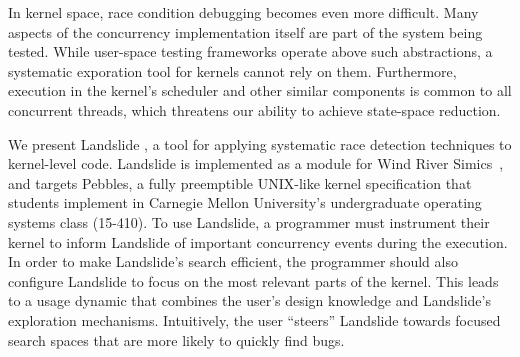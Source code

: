 \documentclass{llncs}
\begin{document}
In kernel space, race condition debugging becomes even more difficult. Many aspects of the concurrency implementation itself are part of the system being tested.
While user-space testing frameworks operate above such abstractions, a systematic exporation tool for kernels cannot rely on them.
Furthermore, execution in the kernel's scheduler and other similar components is common to all concurrent threads, which threatens our ability to achieve state-space reduction.



We present Landslide \cite{landslide},
a tool for applying systematic race detection techniques to kernel-level code.
Landslide is implemented as a module for Wind River Simics\textsuperscript{\texttrademark}~\cite{simics}, and targets Pebbles, a fully preemptible UNIX-like kernel specification that students implement in Carnegie Mellon University's undergraduate operating systems class (15-410).
To use Landslide, a programmer must instrument their kernel to inform Landslide of important concurrency events during the execution. In order to make Landslide's search efficient, the programmer should also configure Landslide to focus on the most relevant parts of the kernel.
This leads to a usage dynamic that combines the user's design knowledge and Landslide's exploration mechanisms. Intuitively, the user ``steers'' Landslide towards focused search spaces that are more likely to quickly find bugs.
\end{document}
